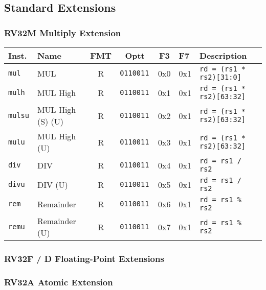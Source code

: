 \subsection*{Standard Extensions}

\subsubsection*{RV32M Multiply Extension}
\begin{tabular}
{l | l | c | c | c | l | l } \hline
Inst.       & Name              & FMT   & Optt         & F3  & F7  & Description                \\ \hline
\tt{mul}  & MUL               & R     & \tt{0110011} & 0x0 & 0x1 & \tt{rd = (rs1 * rs2)[31:0]}  \\
\tt{mulh} & MUL High          & R     & \tt{0110011} & 0x1 & 0x1 & \tt{rd = (rs1 * rs2)[63:32]} \\
\tt{mulsu}& MUL High (S) (U)  & R     & \tt{0110011} & 0x2 & 0x1 & \tt{rd = (rs1 * rs2)[63:32]} \\
\tt{mulu} & MUL High (U)      & R     & \tt{0110011} & 0x3 & 0x1 & \tt{rd = (rs1 * rs2)[63:32]} \\
\tt{div}  & DIV               & R     & \tt{0110011} & 0x4 & 0x1 & \tt{rd = rs1 / rs2}          \\
\tt{divu} & DIV (U)           & R     & \tt{0110011} & 0x5 & 0x1 & \tt{rd = rs1 / rs2}          \\
\tt{rem}  & Remainder         & R     & \tt{0110011} & 0x6 & 0x1 & \tt{rd = rs1 \% rs2}         \\
\tt{remu} & Remainder (U)     & R     & \tt{0110011} & 0x7 & 0x1 & \tt{rd = rs1 \% rs2}         \\
\hline
\end{tabular}

\subsubsection*{RV32F / D Floating-Point Extensions}

\subsubsection*{RV32A Atomic Extension}